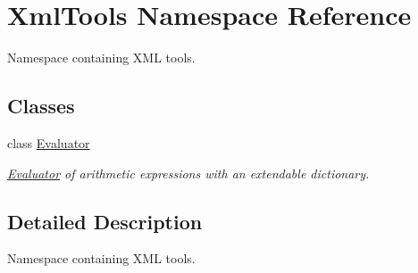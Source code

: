 \hypertarget{namespace_xml_tools}{
\section{XmlTools Namespace Reference}
\label{namespace_xml_tools}
}


Namespace containing XML tools.  
\subsection*{Classes}
\begin{DoxyCompactItemize}
\item 
class \hyperlink{class_xml_tools_1_1_evaluator}{Evaluator}
\begin{DoxyCompactList}\small\item\em \hyperlink{class_xml_tools_1_1_evaluator}{Evaluator} of arithmetic expressions with an extendable dictionary. \item\end{DoxyCompactList}\end{DoxyCompactItemize}


\subsection{Detailed Description}
Namespace containing XML tools. 